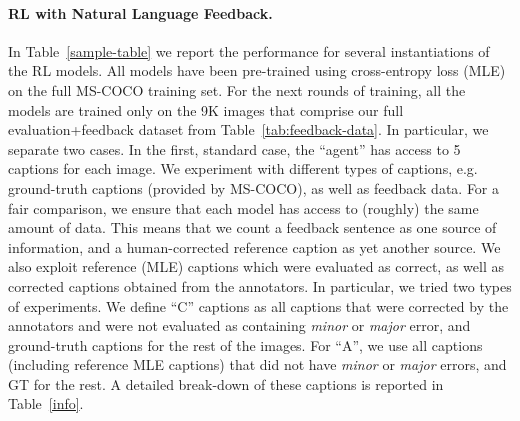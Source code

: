 





\vspace{-2mm}
\paragraph{RL with Natural Language Feedback.} In Table~\ref{sample-table} we report the performance for several instantiations of the RL models. All models have been pre-trained using cross-entropy loss (MLE) on the full MS-COCO training set. For the next rounds of training, all the models are trained only on the 9K images that comprise our full  evaluation+feedback dataset from Table~\ref{tab:feedback-data}. 
In particular, we separate two cases. In the first, standard case, the ``agent'' has access to 5 captions for each image. We experiment with different types of captions, e.g. ground-truth captions (provided by MS-COCO), as well as feedback data. For a fair comparison, we ensure that each model has access to (roughly) the same amount of data. This means that we count a feedback sentence as one source of information, and a human-corrected reference caption as yet another source. %
We also exploit reference (MLE) captions which were evaluated as correct, as well as corrected captions obtained from the annotators. In particular, we tried two types of experiments. We define ``C'' captions as all captions that were corrected by the annotators and were not evaluated as containing \emph{minor} or \emph{major} error, and ground-truth captions for the rest of the images. For ``A'', we use all captions (including reference MLE captions) that did not have \emph{minor} or \emph{major} errors, and GT for the rest. A detailed break-down of these captions is reported in Table~\ref{info}.
